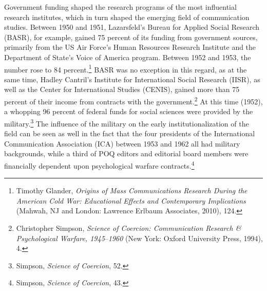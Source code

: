 \documentclass{tufte-handout}
\begin{document}
Government funding shaped the research programs of the most influential
research institutes, which in turn shaped the emerging field of
communication studies. Between 1950 and 1951, Lazarsfeld's Bureau for
Applied Social Research (BASR), for example, gained 75 percent of its
funding from government sources, primarily from the US Air Force's Human
Resources Research Institute and the Department of State's Voice of
America program. Between 1952 and 1953, the number rose to 84
percent.\footnote{Timothy Glander, \emph{Origins of Mass Communications
  Research During the American Cold War: Educational Effects and
  Contemporary Implications} (Mahwah, NJ and London: Lawrence Erlbaum
  Associates, 2010), 124.} BASR was no exception in this regard, as at
the same time, Hadley Cantril's Institute for International Social
Research (IISR), as well as the Center for International Studies
(CENIS), gained more than 75 percent of their income from contracts with
the government.\footnote{Christopher Simpson, \emph{Science of Coercion:
  Communication Research \& Psychological Warfare, 1945}--\emph{1960}
  (New York: Oxford University Press, 1994), 4.} At this time (1952), a
whopping 96 percent of federal funds for social sciences were provided
by the military.\footnote{Simpson, \emph{Science of Coercion}, 52.} The
influence of the military on the early institutionalization of the field
can be seen as well in the fact that the four presidents of the
International Communication Association (ICA) between 1953 and 1962 all
had military backgrounds, while a third of POQ editors and editorial
board members were financially dependent upon psychological warfare
contracts.\footnote{Simpson, \emph{Science of Coercion}, 43.}
\end{document}
